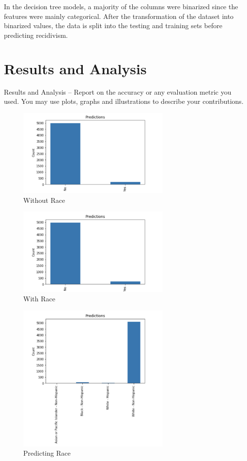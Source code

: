\documentclass[11pt, sigconf]{acmart}
\begin{document}
In the decision tree models, a majority of the columns were binarized since the features were mainly categorical. After the transformation of the dataset into binarized values, the data is split into the testing and training sets before predicting recidivism.



\section{Results and Analysis}
Results and Analysis – Report on the accuracy or any evaluation metric you used. You may use
plots, graphs and
illustrations to describe your contributions.

\begin{figure}[h] 	
\centering
\includegraphics[width=3in]{2.png}
\caption{Without Race}
\end{figure}

\begin{figure}[h] 	
\centering
\includegraphics[width=3in]{3.png}
\caption{With Race}
\end{figure}

\begin{figure}[h] 	
\centering
\includegraphics[width=3in]{4.png}
\caption{Predicting Race}
\end{figure}
\end{document}
